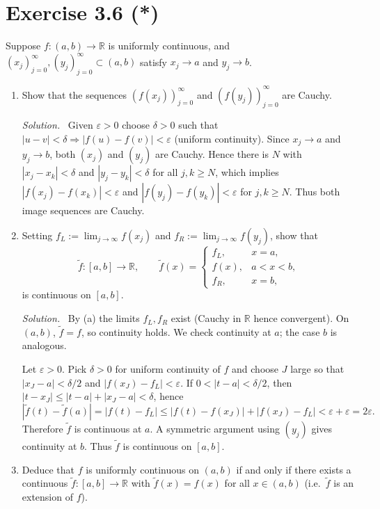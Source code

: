 \documentclass[11pt,a4paper]{article}
\newenvironment{solution}{\par\noindent\textit{Solution.}\ }{\par\vspace{0.5em}}
\begin{document}
\section*{Exercise 3.6 (*)}
Suppose $f:(a,b)\to\mathbb{R}$ is uniformly continuous, and $(x_j)_{j=0}^\infty,(y_j)_{j=0}^\infty\subset(a,b)$ satisfy
$x_j\to a$ and $y_j\to b$.
\begin{enumerate}
	\renewcommand\labelenumi{(\alph{enumi})}
	\item Show that the sequences $(f(x_j))_{j=0}^\infty$ and $(f(y_j))_{j=0}^\infty$ are Cauchy.
	
	\begin{solution}
		Given $\varepsilon>0$ choose $\delta>0$ such that $|u-v|<\delta\Rightarrow |f(u)-f(v)|<\varepsilon$ (uniform continuity).
		Since $x_j\to a$ and $y_j\to b$, both $(x_j)$ and $(y_j)$ are Cauchy. Hence there is $N$ with
		$|x_j-x_k|<\delta$ and $|y_j-y_k|<\delta$ for all $j,k\ge N$, which implies
		$|f(x_j)-f(x_k)|<\varepsilon$ and $|f(y_j)-f(y_k)|<\varepsilon$ for $j,k\ge N$. Thus both image sequences are Cauchy.
	\end{solution}
	
	\item Setting $f_L:=\lim_{j\to\infty}f(x_j)$ and $f_R:=\lim_{j\to\infty}f(y_j)$, show that
	\[
	\tilde f:[a,b]\to\mathbb{R},\qquad
	\tilde f(x)=
	\begin{cases}
		f_L,& x=a,\\
		f(x),& a<x<b,\\
		f_R,& x=b,
	\end{cases}
	\]
	is continuous on $[a,b]$.
	
	\begin{solution}
		By (a) the limits $f_L,f_R$ exist (Cauchy in $\mathbb{R}$ hence convergent). On $(a,b)$, $\tilde f=f$, so continuity holds.
		We check continuity at $a$; the case $b$ is analogous.
		
		Let $\varepsilon>0$. Pick $\delta>0$ for uniform continuity of $f$ and choose $J$ large so that
		$|x_J-a|<\delta/2$ and $|f(x_J)-f_L|<\varepsilon$. If $0<|t-a|<\delta/2$, then
		$|t-x_J|\le |t-a|+|x_J-a|<\delta$, hence
		\[
		|\tilde f(t)-\tilde f(a)|=|f(t)-f_L|\le |f(t)-f(x_J)|+|f(x_J)-f_L|<\varepsilon+\varepsilon=2\varepsilon.
		\]
		Therefore $\tilde f$ is continuous at $a$. A symmetric argument using $(y_j)$ gives continuity at $b$.
		Thus $\tilde f$ is continuous on $[a,b]$.
	\end{solution}
	
	\item Deduce that $f$ is uniformly continuous on $(a,b)$ if and only if there exists a continuous
	$\tilde f:[a,b]\to\mathbb{R}$ with $\tilde f(x)=f(x)$ for all $x\in(a,b)$ (i.e.\ $\tilde f$ is an extension of $f$).
	

\end{enumerate}
\end{document}
